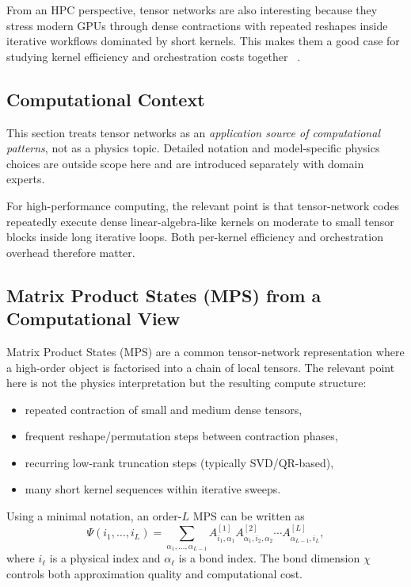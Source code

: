 From an HPC perspective, tensor networks are also interesting because they
stress modern GPUs through dense contractions with repeated reshapes inside
iterative workflows dominated by short kernels. This makes them a good case for studying
kernel efficiency and orchestration costs together
~\cite{zhou2020limits,ayral2023dmrg-circuit-fidelity}.

\subsection{Computational Context}\label{sec:tensor-context}

This section treats tensor networks as an \emph{application source of
computational patterns}, not as a physics topic. Detailed notation and
model-specific physics choices are outside scope here and are introduced
separately with domain experts.

For high-performance computing, the relevant point is that tensor-network codes
repeatedly execute dense linear-algebra-like kernels on moderate to small
tensor blocks inside long iterative loops. Both per-kernel efficiency and
orchestration overhead therefore matter.

\subsection{Matrix Product States (MPS) from a Computational View}
\label{sec:mps-computational-view}

Matrix Product States (MPS) are a common tensor-network representation where a
high-order object is factorised into a chain of local tensors. The relevant
point here is not the physics interpretation but the resulting compute
structure:

\begin{itemize}
  \item repeated contraction of small and medium dense tensors,
  \item frequent reshape/permutation steps between contraction phases,
  \item recurring low-rank truncation steps (typically SVD/QR-based),
  \item many short kernel sequences within iterative sweeps.
\end{itemize}

Using a minimal notation, an order-$L$ MPS can be written as
\[
  \Psi(i_1,\dots,i_L)=
  \sum_{\alpha_1,\dots,\alpha_{L-1}}
  A^{[1]}_{i_1,\alpha_1}
  A^{[2]}_{\alpha_1,i_2,\alpha_2}
  \cdots
  A^{[L]}_{\alpha_{L-1},i_L},
\]
where $i_\ell$ is a physical index and $\alpha_\ell$ is a bond index. The bond
dimension $\chi$ controls both approximation quality and computational cost.

